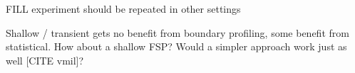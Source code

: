 

FILL experiment should be repeated in other settings

Shallow / transient gets no benefit from boundary profiling,
some benefit from statistical.
How about a shallow FSP?
Would a simpler approach work just as well [CITE vmil]?


